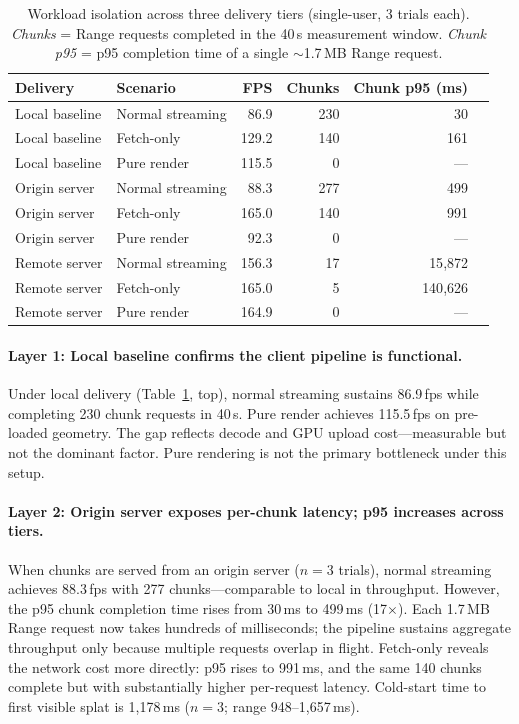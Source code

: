 \begin{table}[t]
\centering
\caption{Workload isolation across three delivery tiers (single-user, 3 trials each). \emph{Chunks} = Range requests completed in the 40\,s measurement window. \emph{Chunk p95} = p95 completion time of a single ${\sim}$1.7\,MB Range request.}
\label{tab:motivation}
\small
\begin{tabular}{@{}llrrrr@{}}
\toprule
Delivery & Scenario & FPS & Chunks & Chunk p95 (ms) \\
\midrule
Local baseline & Normal streaming & 86.9 & 230 & 30 \\
Local baseline & Fetch-only & 129.2 & 140 & 161 \\
Local baseline & Pure render & 115.5 & 0 & --- \\
\midrule
Origin server & Normal streaming & 88.3 & 277 & 499 \\
Origin server & Fetch-only & 165.0 & 140 & 991 \\
Origin server & Pure render & 92.3 & 0 & --- \\
\midrule
Remote server & Normal streaming & 156.3 & 17 & 15{,}872 \\
Remote server & Fetch-only & 165.0 & 5 & 140{,}626 \\
Remote server & Pure render & 164.9 & 0 & --- \\
\bottomrule
\end{tabular}
\end{table}

\paragraph{Layer 1: Local baseline confirms the client pipeline is functional.}
Under local delivery (Table~\ref{tab:motivation}, top), normal streaming sustains 86.9\,fps while completing 230 chunk requests in 40\,s.
Pure render achieves 115.5\,fps on pre-loaded geometry.
The gap reflects decode and GPU upload cost---measurable but not the dominant factor.
Pure rendering is not the primary bottleneck under this setup.

\paragraph{Layer 2: Origin server exposes per-chunk latency; p95 increases across tiers.}
When chunks are served from an origin server ($n{=}3$ trials), normal streaming achieves 88.3\,fps with 277 chunks---comparable to local in throughput.
However, the p95 chunk completion time rises from 30\,ms to 499\,ms (17$\times$).
Each 1.7\,MB Range request now takes hundreds of milliseconds; the pipeline sustains aggregate throughput only because multiple requests overlap in flight.
Fetch-only reveals the network cost more directly: p95 rises to 991\,ms, and the same 140 chunks complete but with substantially higher per-request latency.
Cold-start time to first visible splat is 1{,}178\,ms ($n{=}3$; range 948--1{,}657\,ms).

